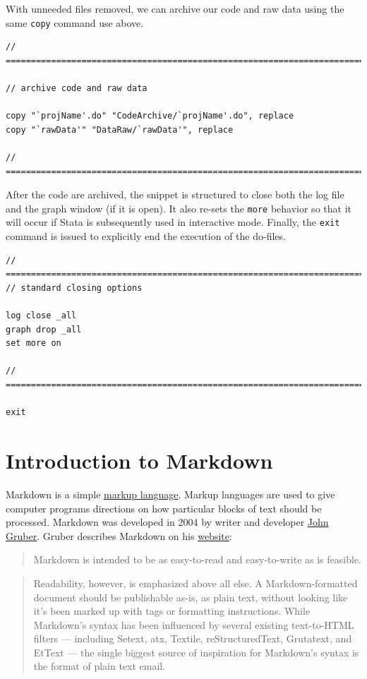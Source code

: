 \documentclass[]{book}
\begin{document}
With unneeded files removed, we can archive our code and raw data using
the same \texttt{copy} command use above.

\begin{verbatim}
// ==========================================================================

// archive code and raw data

copy "`projName'.do" "CodeArchive/`projName'.do", replace
copy "`rawData'" "DataRaw/`rawData'", replace

// ==========================================================================
\end{verbatim}

After the code are archived, the snippet is structured to close both the
log file and the graph window (if it is open). It also re-sets the
\texttt{more} behavior so that it will occur if Stata is subsequently
used in interactive mode. Finally, the \texttt{exit} command is issued
to explicitly end the execution of the do-files.

\begin{verbatim}
// ==========================================================================
// standard closing options

log close _all
graph drop _all
set more on

// ==========================================================================

exit
\end{verbatim}

\chapter{Introduction to Markdown}\label{introduction-to-markdown}

Markdown is a simple
\href{https://en.wikipedia.org/wiki/Markup_language}{markup language}.
Markup languages are used to give computer programs directions on how
particular blocks of text should be processed. Markdown was developed in
2004 by writer and developer \href{http://daringfireball.net}{John
Gruber}. Gruber describes Markdown on his
\href{http://daringfireball.net/projects/markdown/}{website}:

\begin{quote}
Markdown is intended to be as easy-to-read and easy-to-write as is
feasible.
\end{quote}

\begin{quote}
Readability, however, is emphasized above all else. A Markdown-formatted
document should be publishable as-is, as plain text, without looking
like it's been marked up with tags or formatting instructions. While
Markdown's syntax has been influenced by several existing text-to-HTML
filters --- including Setext, atx, Textile, reStructuredText, Grutatext,
and EtText --- the single biggest source of inspiration for Markdown's
syntax is the format of plain text email.
\end{quote}
\end{document}
